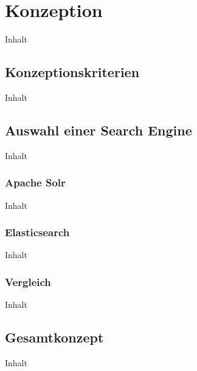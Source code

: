 \chapter{Konzeption\label{chap4:Viertes-Kapitel}}

Inhalt

\section{Konzeptionskriterien\label{sec4.1:Unterpunkt-1}}

Inhalt

\section{Auswahl einer Search Engine\label{sec4.2:Unterpunkt-2}}

Inhalt

\subsection{Apache Solr\label{subsec4.2.1:Unterunterpunkt-1}}

Inhalt

\subsection{Elasticsearch\label{subsec4.2.2:Unterunterpunkt-2}}

Inhalt

\subsection{Vergleich\label{subsec4.2.3:Unterunterpunkt-3}}

Inhalt

\section{Gesamtkonzept\label{sec4.3:Unterpunkt-3}}

Inhalt